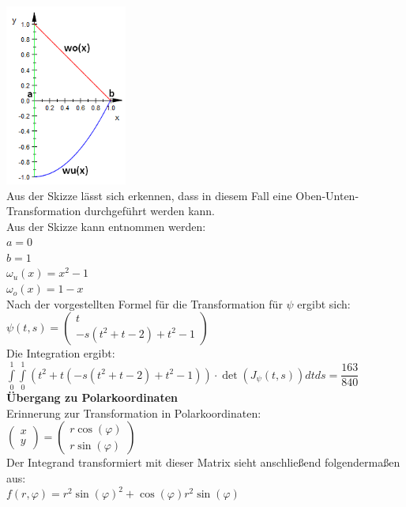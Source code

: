 \documentclass[11pt,final]{scrreprt}
\begin{document}
\includegraphics[width=4cm]{images/flaechenintegral/a1Skizze3.png}\\

Aus der Skizze lässt sich erkennen, dass in diesem Fall eine Oben-Unten-Transformation durchgeführt werden kann.\\ 
Aus der Skizze kann entnommen werden:\\
$ a = 0$\\
$ b = 1$\\
$ \omega_u(x) = x^2-1$\\
$ \omega_o(x) = 1-x$\\

Nach der vorgestellten Formel für die Transformation für $\psi$ ergibt sich:\\
$ \psi(t, s) = \left(\begin{matrix}
t\\-s(t^2+t-2)+t^2-1
\end{matrix}\right)$\\

Die Integration ergibt:\\
$ \int\limits_0^1\int\limits_0^1 (t^2 + t(-s(t^2+t-2)+t^2-1))\cdot \det(J_{\psi}(t, s)) dt ds = \dfrac{163}{840} $\\

\textbf{Übergang zu Polarkoordinaten}\\

Erinnerung zur Transformation in Polarkoordinaten:\\
$ \left( \begin{matrix}
x\\y
\end{matrix}\right) = \left( \begin{matrix}
r\cos(\varphi)\\r\sin(\varphi)
\end{matrix}\right) $\\

Der Integrand transformiert mit dieser Matrix sieht anschließend folgendermaßen aus:\\
$ f(r, \varphi) = r^2\sin(\varphi)^2+\cos(\varphi)r^2\sin(\varphi) $\\
\end{document}
